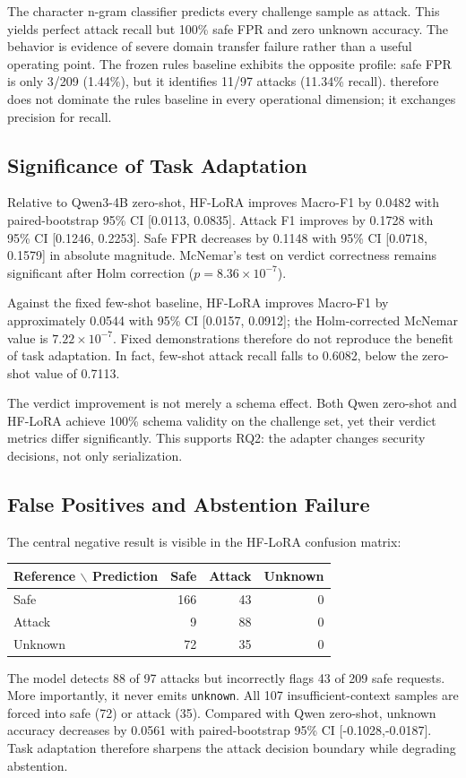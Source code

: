 The character n-gram classifier predicts every challenge sample as attack. This yields perfect attack recall but 100\% safe FPR and zero unknown accuracy. The behavior is evidence of severe domain transfer failure rather than a useful operating point. The frozen rules baseline exhibits the opposite profile: safe FPR is only 3/209 (1.44\%), but it identifies 11/97 attacks (11.34\% recall). \model{} therefore does not dominate the rules baseline in every operational dimension; it exchanges precision for recall.

\subsection{Significance of Task Adaptation}
Relative to Qwen3-4B zero-shot, HF-LoRA improves Macro-F1 by 0.0482 with paired-bootstrap 95\% CI [0.0113, 0.0835]. Attack F1 improves by 0.1728 with 95\% CI [0.1246, 0.2253]. Safe FPR decreases by 0.1148 with 95\% CI [0.0718, 0.1579] in absolute magnitude. McNemar's test on verdict correctness remains significant after Holm correction ($p=8.36\times10^{-7}$).

Against the fixed few-shot baseline, HF-LoRA improves Macro-F1 by approximately 0.0544 with 95\% CI [0.0157, 0.0912]; the Holm-corrected McNemar value is $7.22\times10^{-7}$. Fixed demonstrations therefore do not reproduce the benefit of task adaptation. In fact, few-shot attack recall falls to 0.6082, below the zero-shot value of 0.7113.

The verdict improvement is not merely a schema effect. Both Qwen zero-shot and HF-LoRA achieve 100\% schema validity on the challenge set, yet their verdict metrics differ significantly. This supports RQ2: the adapter changes security decisions, not only serialization.

\subsection{False Positives and Abstention Failure}
The central negative result is visible in the HF-LoRA confusion matrix:
\begin{center}
\begin{tabular}{lrrr}
\toprule
Reference $\backslash$ Prediction & Safe & Attack & Unknown \\
\midrule
Safe & 166 & 43 & 0 \\
Attack & 9 & 88 & 0 \\
Unknown & 72 & 35 & 0 \\
\bottomrule
\end{tabular}
\end{center}
The model detects 88 of 97 attacks but incorrectly flags 43 of 209 safe requests. More importantly, it never emits \texttt{unknown}. All 107 insufficient-context samples are forced into safe (72) or attack (35). Compared with Qwen zero-shot, unknown accuracy decreases by 0.0561 with paired-bootstrap 95\% CI [-0.1028,-0.0187]. Task adaptation therefore sharpens the attack decision boundary while degrading abstention.

